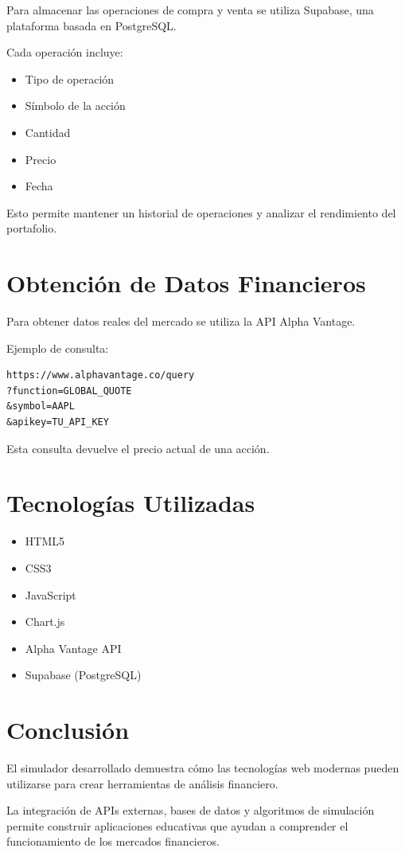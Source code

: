 \documentclass[a4paper,12pt]{article}
\begin{document}
Para almacenar las operaciones de compra y venta se utiliza Supabase, una plataforma basada en PostgreSQL.

Cada operación incluye:

\begin{itemize}
\item Tipo de operación
\item Símbolo de la acción
\item Cantidad
\item Precio
\item Fecha
\end{itemize}

Esto permite mantener un historial de operaciones y analizar el rendimiento del portafolio.

\section{Obtención de Datos Financieros}

Para obtener datos reales del mercado se utiliza la API Alpha Vantage.

Ejemplo de consulta:

\begin{lstlisting}
https://www.alphavantage.co/query
?function=GLOBAL_QUOTE
&symbol=AAPL
&apikey=TU_API_KEY
\end{lstlisting}

Esta consulta devuelve el precio actual de una acción.

\section{Tecnologías Utilizadas}

\begin{itemize}
\item HTML5
\item CSS3
\item JavaScript
\item Chart.js
\item Alpha Vantage API
\item Supabase (PostgreSQL)
\end{itemize}

\section{Conclusión}

El simulador desarrollado demuestra cómo las tecnologías web modernas pueden utilizarse para crear herramientas de análisis financiero.

La integración de APIs externas, bases de datos y algoritmos de simulación permite construir aplicaciones educativas que ayudan a comprender el funcionamiento de los mercados financieros.
\end{document}
